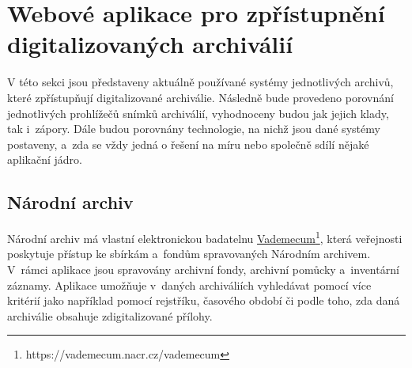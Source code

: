 \chapter{Webové aplikace pro zpřístupnění digitalizovaných archiválií}
 \label{chap:archives}
V této sekci jsou představeny aktuálně používané systémy jednotlivých archivů, které zpřístupňují digitalizované archiválie. Následně bude provedeno porovnání jednotlivých prohlížečů snímků archiválií, vyhodnoceny budou jak jejich klady, tak i~zápory. Dále budou porovnány technologie, na nichž jsou dané systémy postaveny, a~zda se vždy jedná o řešení na míru nebo společně sdílí nějaké aplikační jádro.

\section{Národní archiv}
Národní archiv má vlastní elektronickou badatelnu \href{https://vademecum.nacr.cz/vademecum}{Vademecum}\footnote{https://vademecum.nacr.cz/vademecum}, která veřejnosti poskytuje přístup ke sbírkám a~fondům spravovaných Národním archivem. V~rámci aplikace jsou spravovány archivní fondy, archivní pomůcky a~inventární záznamy. Aplikace umožňuje v~daných archiváliích vyhledávat pomocí více kritérií jako například pomocí rejstříku, časového období či podle toho, zda daná archiválie obsahuje zdigitalizované přílohy. 

